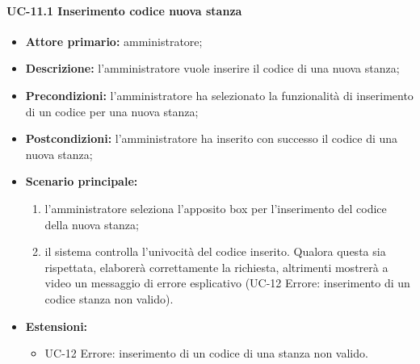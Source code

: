 \paragraph{UC-11.1 Inserimento codice nuova stanza}
   \begin{itemize}
	\item \textbf{Attore primario:} amministratore;
	\item \textbf{Descrizione:} l'amministratore vuole inserire il codice di una nuova stanza;
	\item \textbf{Precondizioni:} l'amministratore ha selezionato la funzionalità di inserimento di un codice per una nuova stanza;
	\item \textbf{Postcondizioni:} l'amministratore ha inserito con successo il codice di una nuova stanza;
	\item \textbf{Scenario principale:}
	      \begin{enumerate}
		      \item l'amministratore seleziona l'apposito box per l'inserimento del codice della nuova stanza;
		      \item il sistema controlla l'univocità del codice inserito. Qualora questa sia rispettata, elaborerà correttamente la richiesta, altrimenti mostrerà a video un messaggio di errore esplicativo (UC-12 Errore: inserimento di un codice stanza non valido).
	      \end{enumerate}
	\item \textbf{Estensioni:}
		\begin{itemize}
		      \item UC-12 Errore: inserimento di un codice di una stanza non valido.
	      \end{itemize}
\end{itemize}


